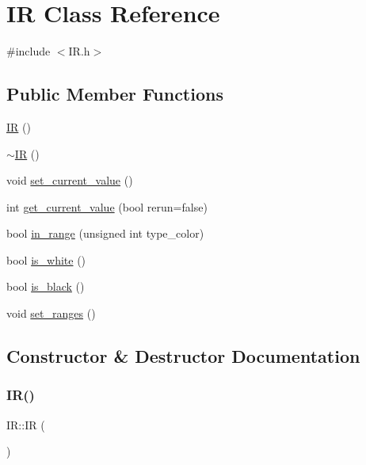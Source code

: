 \hypertarget{class_i_r}{}\section{IR Class Reference}
\label{class_i_r}


{\ttfamily \#include $<$I\+R.\+h$>$}

\subsection*{Public Member Functions}
\begin{DoxyCompactItemize}
\item 
\mbox{\hyperlink{class_i_r_aa4098d98350ff7f6fa1d58ef97283946}{IR}} ()
\item 
\mbox{\hyperlink{class_i_r_acc2e758f018c7b069315a826e9ca3043}{$\sim$\+IR}} ()
\item 
void \mbox{\hyperlink{class_i_r_a2d60cbf66f48bad8167e2c4231ed3f95}{set\+\_\+current\+\_\+value}} ()
\item 
int \mbox{\hyperlink{class_i_r_a5b71d10f57e8dbb76cdf01e043cfdda1}{get\+\_\+current\+\_\+value}} (bool rerun=false)
\item 
bool \mbox{\hyperlink{class_i_r_a388cfd7a959fa4a24d8e2bad1e9d95d5}{in\+\_\+range}} (unsigned int type\+\_\+color)
\item 
bool \mbox{\hyperlink{class_i_r_ae05cf1ad5888262586007946f21ac14e}{is\+\_\+white}} ()
\item 
bool \mbox{\hyperlink{class_i_r_a2f62691ee90ca2a9035c088029dab4bb}{is\+\_\+black}} ()
\item 
void \mbox{\hyperlink{class_i_r_a8bcc5c0570384da5a39e395b91bc2d2b}{set\+\_\+ranges}} ()
\end{DoxyCompactItemize}


\subsection{Constructor \& Destructor Documentation}
\mbox{\label{class_i_r_aa4098d98350ff7f6fa1d58ef97283946}} 
\subsubsection{\texorpdfstring{I\+R()}{IR()}}
{\footnotesize\ttfamily I\+R\+::\+IR (\begin{DoxyParamCaption}{ }\end{DoxyParamCaption})}

